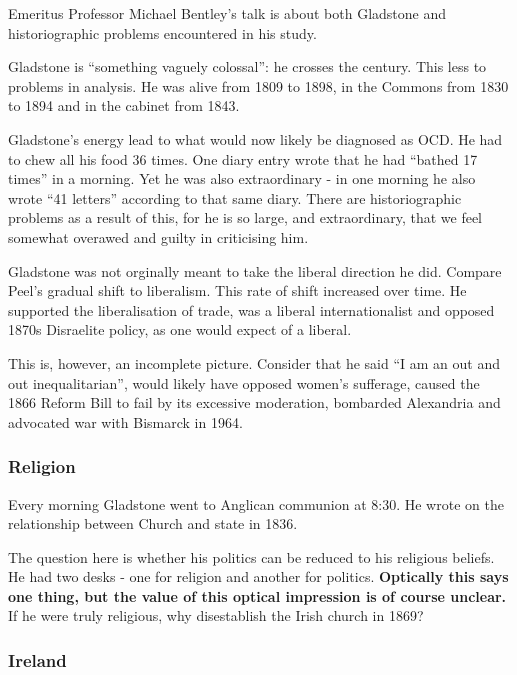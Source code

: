 \documentclass[11pt,a4paper]{report}
\newcounter{count}
\begin{document}
	\begin{multicols}{2}
		
		Emeritus Professor Michael Bentley's talk is about both Gladstone and historiographic problems encountered in his study.
		
		Gladstone is ``something vaguely colossal'': he crosses the  century. This less to problems in analysis. He was alive from 1809 to 1898, in the Commons from 1830 to 1894 and in the cabinet from 1843. 
		
		Gladstone's energy lead to what would now likely be diagnosed as OCD. He had to chew all his food 36 times. One diary entry wrote that he had ``bathed 17 times'' in a morning. Yet he was also extraordinary - in one morning he also wrote ``41 letters'' according to that same diary. There are historiographic problems as a result of this, for he is so large, and extraordinary, that we feel somewhat overawed and guilty in criticising him. 
		
		Gladstone was not orginally meant to take the liberal direction he did. Compare Peel's gradual shift to liberalism. This rate of shift increased over time. He supported the liberalisation of trade, was a liberal internationalist and opposed 1870s Disraelite policy, as one would expect of a liberal.
		
		This is, however, an incomplete picture. Consider that he said ``I am an out and out inequalitarian'', would likely have opposed women's sufferage, caused the 1866 Reform Bill to fail by its excessive moderation, bombarded Alexandria and advocated war with Bismarck in 1964. 
		
		\subsubsection{Religion}
		
		Every morning Gladstone went to Anglican communion at 8:30. He wrote on the relationship between Church and state in 1836.
		
		The question here is whether his politics can be reduced to his religious beliefs. He had two desks - one for religion and another for politics. \textbf{Optically this says one thing, but the value of this optical impression is of course unclear.} If he were truly religious, why disestablish the Irish church in 1869?
		
		\subsubsection{Ireland}
		

\end{multicols}
\end{document}
